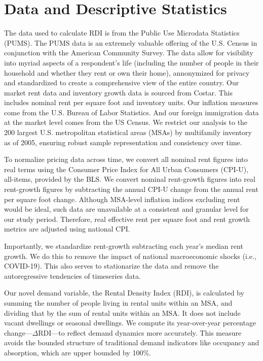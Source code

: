 \documentclass[APA,Times1COL]{WileyNJDv5} %
\begin{document}
\section{Data and Descriptive Statistics}\label{sec3}
The data used to calculate RDI is from the Public Use Microdata Statistics (PUMS). The PUMS data is an extremely valuable offering of the U.S. Census in conjunction with the American Community Survey. The data allow for visibility into myriad aspects of a respondent's life (including the number of people in their household and whether they rent or own their home), annonymized for privacy and standardized to create a comprehensive view of the entire country. 
Our market rent data and inventory growth data is sourced from Costar. This includes nominal rent per square foot and inventory units. Our inflation measures come from the U.S. Bureau of Labor Statistics. And our foreign immigration data at the market level comes from the US Census. We restrict our analysis to the 200 largest U.S. metropolitan statistical areas (MSAs) by multifamily inventory as of 2005, ensuring robust sample representation and consistency over time.

To normalize pricing data across time, we convert all nominal rent figures into real terms using the Consumer Price Index for All Urban Consumers (CPI-U), all-items, provided by the BLS. We convert nominal rent-growth figures into real rent-growth figures by subtracting the annual CPI-U change from the annual rent per square foot change. Although MSA-level inflation indices excluding rent would be ideal, such data are unavailable at a consistent and granular level for our study period. Therefore, real effective rent per square foot and rent growth metrics are adjusted using national CPI. 

Importantly, we standardize rent-growth subtracting each year's median rent growth. We do this to remove the impact of national macroeconomic shocks (i.e., COVID-19). This also serves to stationarize the data and remove the autoregressive tendencies of timeseries data.

Our novel demand variable, the Rental Density Index (RDI), is calculated by summing the number of people living in rental units within an MSA, and dividing that by the sum of rental units within an MSA. It does not include vacant dwellings or seasonal dwellings. We compute its year-over-year percentage change---\(\Delta\text{RDI}\)---to reflect demand dynamics more accurately. This measure avoids the bounded structure of traditional demand indicators like occupancy and absorption, which are upper bounded by 100\%.
\end{document}
